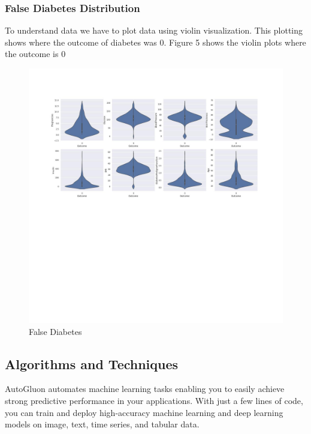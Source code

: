 \documentclass[
]{article}
\begin{document}
\hypertarget{false-diabetes-distribution}{%
\subsubsection{False Diabetes
Distribution}\label{false-diabetes-distribution}}

To understand data we have to plot data using violin visualization. This
plotting shows where the outcome of diabetes was 0. Figure 5 shows the
violin plots where the outcome is 0

\begin{figure}
\centering
\includegraphics{falsediab.jpg}
\caption{False Diabetes}
\end{figure}

\hypertarget{algorithms-and-techniques}{%
\subsection{Algorithms and Techniques}\label{algorithms-and-techniques}}

AutoGluon automates machine learning tasks enabling you to easily
achieve strong predictive performance in your applications. With just a
few lines of code, you can train and deploy high-accuracy machine
learning and deep learning models on image, text, time series, and
tabular data.
\end{document}
